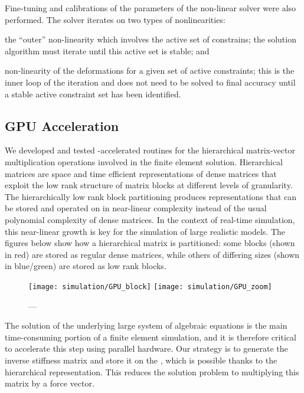Fine-tuning and calibrations of the parameters of the non-linear solver were also performed.  The  solver iterates on two types of nonlinearities:
\begin{enumerate*}[(1)]
\item the \enquote{outer} non-linearity which involves the active set of constrains; the solution algorithm must iterate until this active set is stable; and
\item non-linearity of the deformations for a given set of active constraints; this is the inner loop of the iteration and does not need to be solved to final accuracy until a stable active constraint set has been identified.
\end{enumerate*}


\subsection{GPU Acceleration}\label{ssec:gpu_acceleration}
We developed and tested -accelerated routines for the hierarchical matrix-vector multiplication operations involved in the finite element solution. Hierarchical matrices are space and time efficient representations of dense matrices that exploit the low rank structure of matrix blocks at different levels of granularity. The hierarchically low rank block partitioning produces representations that can be stored and operated on in near-linear complexity instead of the usual polynomial complexity of dense matrices. In the context of real-time simulation, this near-linear growth is key for the simulation of large realistic models. The figures below show how a hierarchical matrix is partitioned: some blocks (shown in red) are stored as regular dense matrices, while others of differing sizes (shown in blue/green) are stored as low rank blocks.

\begin{figure}
  \centering%
	\texttt{[image: simulation/GPU\_block]}\vspace{2ex}
	\texttt{[image: simulation/GPU\_zoom]}\\
	\caption{---}\label{fig:gpu_matrix}
\end{figure}

The solution of the underlying large system of algebraic equations is the main time-consuming portion of a finite element simulation, and it is therefore critical to accelerate this step using  parallel hardware. Our strategy is to generate the inverse stiffness matrix and store it on the , which is possible thanks to the hierarchical representation. This reduces the solution problem to multiplying this matrix by a force vector.

